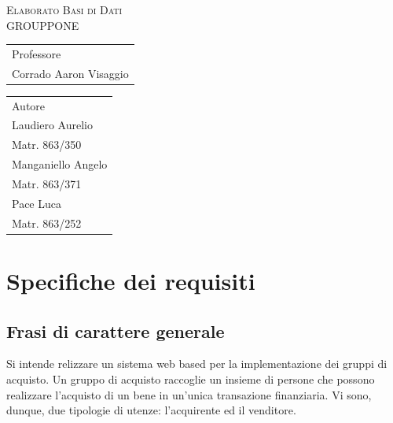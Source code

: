 \documentclass[a4paper, 10pt]{report}
\begin{document}
\begin{center}
\end{center}
\bigskip
\vspace{1cm}
\begin{center}
\textsc{Elaborato Basi di Dati\\
GROUPPONE}
\end{center}
\bigskip
\vspace{6cm}
\begin {tabular}[t]{l}
Professore\\
Corrado Aaron Visaggio
\end{tabular}
\hfill
\begin{tabular}[t]{l}
                 Autore\\
Laudiero Aurelio\\
Matr. 863/350\\
Manganiello Angelo\\
Matr. 863/371\\
Pace Luca\\
Matr. 863/252\\
\end{tabular}
\thispagestyle{empty}
\newpage
\tableofcontents
\thispagestyle{empty}
\newpage
\setcounter{page}{1}
\raggedright
\chapter{Specifiche dei requisiti}

\section{Frasi di carattere generale}
Si intende relizzare un sistema web based per la implementazione dei gruppi di acquisto. Un gruppo di acquisto raccoglie un insieme di persone che possono realizzare l'acquisto di un bene in un'unica transazione finanziaria. 
Vi sono, dunque, due tipologie di utenze: l'acquirente ed il venditore. 
\end{document}
